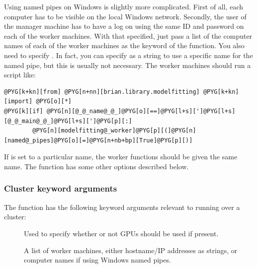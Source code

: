 \documentclass[letterpaper,10pt,english]{manual}
\begin{document}
Using named pipes on Windows is slightly more complicated. First of all, each
computer has to be visible on the local Windows network. Secondly, the user of
the manager machine has to have a log on using the same ID and password on each
of the worker machines. With that specified, just pass a list of the computer
names of each of the worker machines as the  keyword of the
\hyperlink{brian.library.modelfitting.modelfitting}{} function. You also need to specify .
In fact, you can specify  as a string to use a specific name for
the named pipe, but this is usually not necessary. The worker machines should
run a script like:

\begin{Verbatim}[commandchars=@\[\]]
@PYG[k+kn][from] @PYG[n+nn][brian.library.modelfitting] @PYG[k+kn][import] @PYG[o][*]
@PYG[k][if] @PYG[n][@_@_name@_@_]@PYG[o][==]@PYG[l+s][']@PYG[l+s][@_@_main@_@_]@PYG[l+s][']@PYG[p][:]
        @PYG[n][modelfitting@_worker]@PYG[p][(]@PYG[n][named@_pipes]@PYG[o][=]@PYG[n+nb+bp][True]@PYG[p][)]
\end{Verbatim}

If  is set to a particular name, the worker functions should be
given the same name. The \hyperlink{brian.library.modelfitting.modelfitting_worker}{} function has some other
options described below.


\subsubsection{Cluster keyword arguments}

The \hyperlink{brian.library.modelfitting.modelfitting}{} function has the following keyword arguments relevant
to running over a cluster:
\begin{description}
\item[] \leavevmode
Used to specify whether or not GPUs should be used if present.

\item[] \leavevmode
A list of worker machines, either hostname/IP addresses as strings, or
computer names if using Windows named pipes.

\end{description}
\end{document}
